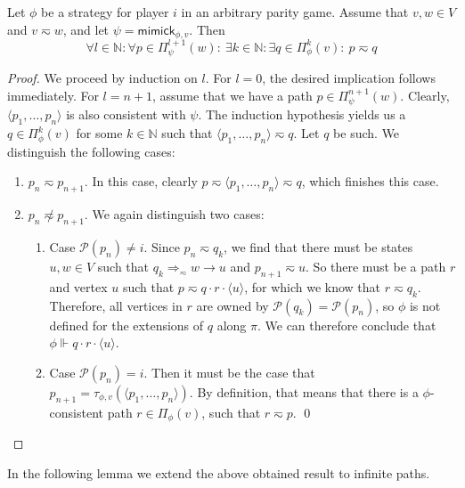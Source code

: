 \documentclass[a4paper]{llncs}
\newcommand{\N}{\ensuremath{\mathbb{N}}\xspace}
\newcommand{\getplayername}{\ensuremath{\mathcal{P}}}
\newcommand{\getplayer}[1]{\getplayername(#1)}
\newcommand{\prefixes}[3][]{\ensuremath{\Pi_{#2}^{#1}(#3)}}
\newcommand{\consistency}{\ensuremath{\Vdash}}
\newcommand{\consistent}[2]{\ensuremath{{#2}\consistency{#1}}}
\newcommand{\path}[1]{\ensuremath{\langle #1 \rangle}}
\newcommand{\pathprefix}[3]{\ensuremath{#1_{#2}^{#3}}}
\newcommand{\To}{\ensuremath{\Longrightarrow}}
\newcommand{\mimick}{\mathsf{mimick}_{\phi,v}}
\newcommand{\stut}{\eqsim}\newcommand{\semistut}{\sim_{\mathrm{semi-st}}}
\newcommand{\pathconcat}{\cdot}
\newcommand{\target}[2]{\tau_{#1}(#2)}
\begin{document}
\renewcommand{\pathprefix}[3]{\vec{#1}}
\newcommand{\slice}[3]{\pathprefix{#1}{}{}_{#2} \ldots \pathprefix{#1}{}{}_{#3}}

\begin{lemma}
\label{lem:strategy_for_stut}
Let $\phi$ be a strategy for player $i$ in an arbitrary parity game. Assume that $v, w \in V$ and $v \stut w$, and let $\psi=\mimick$. Then
$$
  \forall l \in \N:
  \forall p \in \prefixes[l+1]{\psi}{w}:~
  \exists k \in \N:
  \exists q \in \prefixes[k]{\phi}{v}:~
  p \stut q
$$
\end{lemma}
\begin{proof}
  We proceed by induction on $l$. For $l = 0$, the desired implication follows 
  immediately. For $l=n+1$, assume that we have a path  $p \in \prefixes[n+1]{\psi}{w}$. 
  Clearly, $\path{p_1,\ldots,p_n}$ is also consistent with $\psi$. The induction hypothesis yields us a $q\in\prefixes[k]{\phi}{v}$ for some $k\in\N$ such that $\path{p_1,\ldots,p_n} \stut q$. Let $q$
  be such. We distinguish the following cases:
  \begin{enumerate}
    \item $p_n \stut p_{n+1}$. In this case, clearly $p
    \stut \path{p_1,\ldots,p_n} \stut q$, which finishes this
    case.
    
    \item $p_n \not\stut p_{n+1}$. We again distinguish two cases:
    \begin{enumerate}
      \item Case $\getplayer{p_n} \neq i$. Since
      $p_n \stut q_k$, we find that there must be states $u, w \in V$ such that
      $q_k \To_{\stut} w \to u$ and $p_{n+1} \stut u$. So there must be a path
      $r$ and vertex $u$ such that $p \stut q \pathconcat r \pathconcat \path{u}$, for which
      we know that $r \stut q_k$. Therefore, all vertices in $r$ are owned by
      $\getplayer{q_k}=\getplayer{p_n}$, so $\phi$ is not defined for the extensions of 
      $q$ along $\pi$. We can therefore conclude that $\consistent{q \pathconcat r \pathconcat \path{u}}{\phi}$.

      \item Case $\getplayer{p_n} = i$. Then it must be the case that
      $p_{n+1} = \target{\phi,v}{\path{p_1, \ldots, p_n}}$. By definition, that 
      means that there is a $\phi$-consistent path $r \in
      \prefixes{\phi}{v}$, such that $r \stut p$. \qed
    \end{enumerate}
  \end{enumerate} 
\end{proof}
In the following
lemma we extend the above obtained result to infinite paths.
\end{document}
